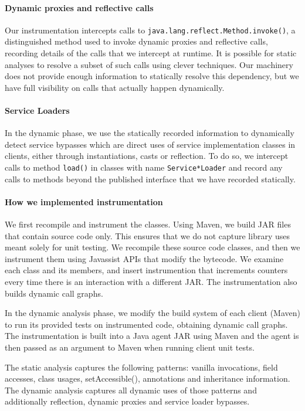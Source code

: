 \paragraph{Dynamic proxies and reflective calls}
Our instrumentation intercepts calls to
\texttt{java.lang.reflect.Method.invoke()}, a distinguished method
used to invoke dynamic proxies and reflective calls, 
recording details of the calls that we intercept at runtime. It is possible for
static analyses to resolve a subset of such calls using clever
techniques. Our machinery does not provide enough information to
statically resolve this dependency, but we have full visibility on
calls that actually happen dynamically.

\paragraph{Service Loaders} In the dynamic phase, we use the statically recorded information to dynamically detect service bypasses which are direct uses of service implementation 
classes in clients, either through instantiations, casts or reflection. To do so, we intercept calls 
to method \texttt{load()} in classes with name \texttt{Service*Loader} and record any calls to methods beyond 
the published interface that we have recorded statically.

\paragraph{How we implemented instrumentation}
We first recompile and instrument the classes. Using Maven, we build JAR
files that contain source code only. This ensures that we do not
capture library uses meant solely for unit testing.  We recompile
these source code classes, and then we instrument them using Javassist
APIs that modify the bytecode. We examine each class and its members,
and insert instrumention that increments counters every time there is
an interaction with a different JAR. The instrumentation also builds
dynamic call graphs.

In the dynamic analysis phase, we modify the build system of each
client (Maven) to run its provided tests on instrumented code,
obtaining dynamic call graphs. 
The instrumentation is built into a Java agent JAR using Maven and 
the agent is then passed as an argument to Maven when running client unit tests.

The static analysis captures the
following patterns: vanilla invocations, field accesses, class usages,
setAccessible(), annotations and inheritance information. The dynamic
analysis captures all dynamic uses of those patterns and additionally
reflection, dynamic proxies and service loader bypasses.

